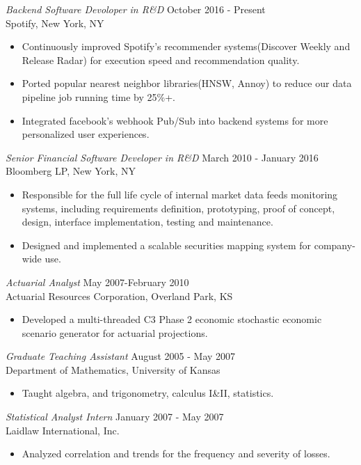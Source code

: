 \documentclass[margin]{res}
\begin{document}
\begin{resume}
		{\sl Backend Software Devoloper in R\&D} \hfill October 2016 - Present\\
		Spotify,
                New York, NY
 \begin{itemize}  
     \item Continuously improved Spotify's recommender systems(Discover Weekly and Release Radar) for execution speed and recommendation quality.
     \item Ported popular nearest neighbor libraries(HNSW, Annoy) to reduce our data pipeline job running time by 25\%+.
     \item Integrated facebook's webhook Pub/Sub into backend systems for more personalized user experiences.
	       \
\end {itemize}
		{\sl Senior Financial Software Developer in R\&D} \hfill March 2010 - January 2016\\
                Bloomberg LP,
                New York, NY 
                 \begin{itemize}  
		 \item Responsible for the full life cycle of internal market data feeds monitoring systems, including requirements definition, prototyping, proof of concept, design, interface implementation, testing and maintenance.
                 \item Designed and implemented a scalable securities mapping system for company-wide use.
		 \end {itemize}
		{\sl Actuarial Analyst} \hfill May 2007-February 2010\\
                Actuarial Resources Corporation,
                Overland Park, KS
                 \begin{itemize} 
                 \item Developed a multi-threaded C3 Phase 2 economic stochastic economic scenario generator for
                   actuarial projections.
                 \end{itemize}
                {\sl Graduate Teaching Assistant} \hfill            August 2005 - May 2007\\
                Department of Mathematics, University of Kansas 
                 \begin{itemize}
                 \item Taught algebra, and trigonometry, calculus I\&II, statistics.
                 \end{itemize} 
                {\sl Statistical Analyst Intern} \hfill             January 2007 - May 2007\\
                Laidlaw International, Inc.
                 \begin{itemize}  \itemsep -2pt %
                 \item Analyzed correlation and trends for the frequency and severity of losses.
                 \end{itemize} 

\end{resume}
\end{document}

